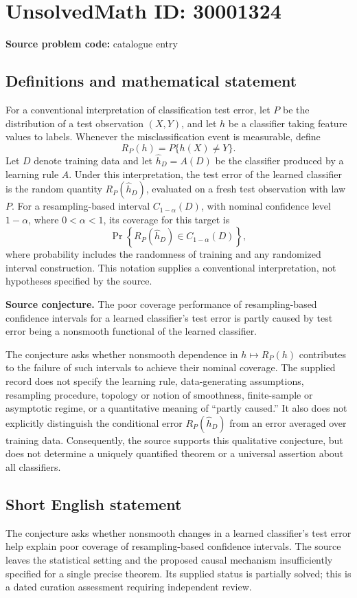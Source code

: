 \documentclass[11pt]{article}
\begin{document}
\section*{UnsolvedMath ID: 30001324}
\textbf{Source problem code:} catalogue entry
\subsection{Definitions and mathematical statement}
For a conventional interpretation of classification test error, let \(P\) be the distribution of a test observation \((X,Y)\), and let \(h\) be a classifier taking feature values to labels. Whenever the misclassification event is measurable, define
\[
R_P(h)=P\{h(X)\ne Y\}.
\]
Let \(D\) denote training data and let \(\widehat h_D=A(D)\) be the classifier produced by a learning rule \(A\). Under this interpretation, the test error of the learned classifier is the random quantity \(R_P(\widehat h_D)\), evaluated on a fresh test observation with law \(P\). For a resampling-based interval \(C_{1-\alpha}(D)\), with nominal confidence level \(1-\alpha\), where \(0<\alpha<1\), its coverage for this target is
\[
\Pr\!\left\{R_P(\widehat h_D)\in C_{1-\alpha}(D)\right\},
\]
where probability includes the randomness of training and any randomized interval construction. This notation supplies a conventional interpretation, not hypotheses specified by the source.

\textbf{Source conjecture.} The poor coverage performance of resampling-based confidence intervals for a learned classifier's test error is partly caused by test error being a nonsmooth functional of the learned classifier.

The conjecture asks whether nonsmooth dependence in \(h\mapsto R_P(h)\) contributes to the failure of such intervals to achieve their nominal coverage. The supplied record does not specify the learning rule, data-generating assumptions, resampling procedure, topology or notion of smoothness, finite-sample or asymptotic regime, or a quantitative meaning of ``partly caused.'' It also does not explicitly distinguish the conditional error \(R_P(\widehat h_D)\) from an error averaged over training data. Consequently, the source supports this qualitative conjecture, but does not determine a uniquely quantified theorem or a universal assertion about all classifiers.
\subsection{Short English statement}
The conjecture asks whether nonsmooth changes in a learned classifier's test error help explain poor coverage of resampling-based confidence intervals. The source leaves the statistical setting and the proposed causal mechanism insufficiently specified for a single precise theorem. Its supplied status is partially solved; this is a dated curation assessment requiring independent review.
\end{document}
